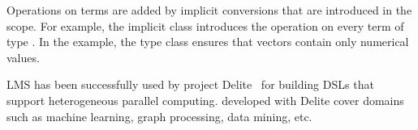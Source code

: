 Operations on  terms are added by implicit conversions that are introduced in the \edsl scope. For example, the implicit class  introduces the \code{+} operation on every term of type . In the example, the type class  ensures that vectors contain only numerical values.

LMS has been successfully used by project Delite~\cite{brown_heterogeneous_2011,composition-ecoop2013} for building DSLs that support heterogeneous parallel computing. \edsls developed with Delite cover domains
such as machine learning, graph processing, data mining, etc.

